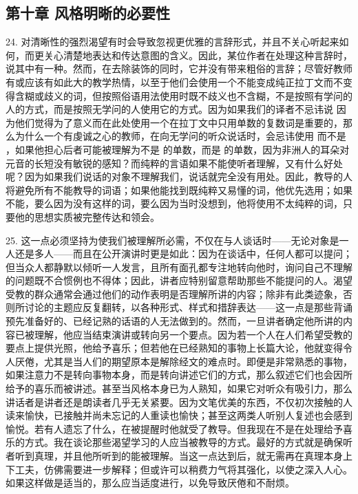 
\subsection{第十章 风格明晰的必要性}

24. 对清晰性的强烈渴望有时会导致忽视更优雅的言辞形式，并且不关心听起来如何，而更关心清楚地表达和传达意图的含义。因此，某位作者在处理这种言辞时，说其中有一种。然而，在去除装饰的同时，它并没有带来粗俗的言辞；尽管好教师有或应该有如此大的教学热情，以至于他们会使用一个不能变成纯正拉丁文而不变得含糊或歧义的词，但按照俗语用法使用时既不歧义也不含糊，不是按照有学问的人的方式，而是按照无学问的人使用它的方式。因为如果我们的译者不忌讳说 因为他们觉得为了意义而在此处使用一个在拉丁文中只用单数的复数词是重要的，那么为什么一个有虔诚之心的教师，在向无学问的听众说话时，会忌讳使用  而不是 ，如果他担心后者可能被理解为不是  的单数，而是  的单数，因为非洲人的耳朵对元音的长短没有敏锐的感知？而纯粹的言语如果不能使听者理解，又有什么好处呢？因为如果我们说话的对象不理解我们，说话就完全没有用处。因此，教导的人将避免所有不能教导的词语；如果他能找到既纯粹又易懂的词，他优先选用；如果不能，要么因为没有这样的词，要么因为当时没想到，他将使用不太纯粹的词，只要他的思想实质被完整传达和领会。\par

25. 这一点必须坚持为使我们被理解所必需，不仅在与人谈话时——无论对象是一人还是多人——而且在公开演讲时更是如此：因为在谈话中，任何人都可以提问；但当众人都静默以倾听一人发言，且所有面孔都专注地转向他时，询问自己不理解的问题既不合惯例也不得体；因此，讲者应特别留意帮助那些不能提问的人。渴望受教的群众通常会通过他们的动作表明是否理解所讲的内容；除非有此类迹象，否则所讨论的主题应反复翻转，以各种形式、样式和措辞表达——这一点是那些背诵预先准备好的、已经记熟的话语的人无法做到的。然而，一旦讲者确定他所讲的内容已被理解，他应当结束演讲或转向另一个要点。因为若一个人在人们希望受教的要点上提供光照，他给予喜乐；但若他在已经熟知的事物上长篇大论，他就变得令人厌倦，尤其是当人们的期望原本是解除经文的难点时。即便是非常熟悉的事物，如果注意力不是转向事物本身，而是转向讲述它们的方式，那么叙述它们也会因所给予的喜乐而被讲述。甚至当风格本身已为人熟知，如果它对听众有吸引力，那么讲话者是讲者还是朗读者几乎无关紧要。因为文笔优美的东西，不仅初次接触的人读来愉快，已接触并尚未忘记的人重读也愉快；甚至这两类人听别人复述也会感到愉悦。若有人遗忘了什么，在被提醒时他就受了教导。但我现在不是在处理给予喜乐的方式。我在谈论那些渴望学习的人应当被教导的方式。最好的方式就是确保听者听到真理，并且他所听到的能被理解。当这一点达到后，就无需再在真理本身上下工夫，仿佛需要进一步解释；但或许可以稍费力气将其强化，以使之深入人心。如果这样做是适当的，那么应当适度进行，以免导致厌倦和不耐烦。\par

